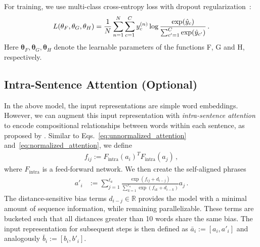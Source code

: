\documentclass[11pt,letterpaper]{article}
\newcommand{\yhat}{\hat{y}}
\newcommand{\thetab}{\mathbf{\theta}}
\newcommand{\RR}{\mathbb{R}}
\begin{document}
For training, we use multi-class cross-entropy loss with dropout regularization~\cite{srivastava2014dropout}:
\begin{align}
\notag
L(\thetab_F, \thetab_G, \thetab_H) = \frac{1}{N} \sum_{n=1}^{N} \sum_{c=1}^{C} y_c^{(n)} \log \frac{\exp(\yhat_c)}{\sum_{c'=1}^C \exp(\yhat_{c'})}\,.
\end{align}
Here $\thetab_F, \thetab_G, \thetab_H$ denote the learnable parameters of the functions F, G and H, respectively.



\subsection{Intra-Sentence Attention (Optional)}
\label{subsec:intra}
In the above model, the input representations are simple word embeddings. However, we can augment this input representation with \emph{intra-sentence attention} to encode compositional relationships between words within each sentence, as proposed by .
Similar to Eqs.~\ref{eq:unnormalized_attention} and~\ref{eq:normalized_attention}, we define
\begin{align}
f_{ij} := F_{\textrm{intra}}(a_i)^{T} F_{\textrm{intra}}(a_j)\,,
\end{align}
where $F_{\textrm{intra}}$ is a feed-forward network. We then create the self-aligned phrases
\begin{align}
a'_i &:= \sum_{j=1}^{\ell_a} \frac{\exp(f_{ij} + d_{i-j})}{\sum_{k=1}^{\ell_a} \exp(f_{ik} + d_{i-k})} a_j\,.
\end{align}
The distance-sensitive bias terms $d_{i-j}\in \RR$ provides the model with a minimal amount of sequence information, while remaining parallelizable.
These terms are bucketed such that all distances greater than 10 words share the same bias.
The input representation for subsequent steps is then defined as $\bar{a}_i := [a_i, a'_i]$ and analogously $\bar{b}_i := [b_i, b'_i]$.
\end{document}
